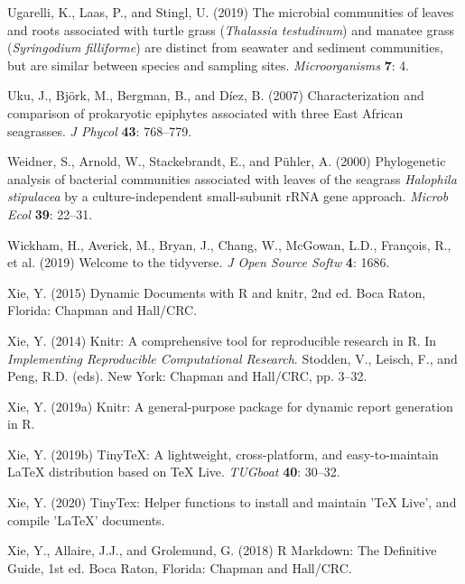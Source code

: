 \documentclass[12pt,]{article}
\begin{document}
\leavevmode\hypertarget{ref-Ugarelli2019}{}%
Ugarelli, K., Laas, P., and Stingl, U. (2019) The microbial communities
of leaves and roots associated with turtle grass (\emph{Thalassia
testudinum}) and manatee grass (\emph{Syringodium filliforme}) are
distinct from seawater and sediment communities, but are similar between
species and sampling sites. \emph{Microorganisms} \textbf{7}: 4.

\leavevmode\hypertarget{ref-Uku2007}{}%
Uku, J., Björk, M., Bergman, B., and Díez, B. (2007) Characterization
and comparison of prokaryotic epiphytes associated with three East
African seagrasses. \emph{J Phycol} \textbf{43}: 768--779.

\leavevmode\hypertarget{ref-Weidner2000}{}%
Weidner, S., Arnold, W., Stackebrandt, E., and Pühler, A. (2000)
Phylogenetic analysis of bacterial communities associated with leaves of
the seagrass \emph{Halophila stipulacea} by a culture-independent
small-subunit rRNA gene approach. \emph{Microb Ecol} \textbf{39}:
22--31.

\leavevmode\hypertarget{ref-Wickham2019}{}%
Wickham, H., Averick, M., Bryan, J., Chang, W., McGowan, L.D., François,
R., et al. (2019) Welcome to the tidyverse. \emph{J Open Source Softw}
\textbf{4}: 1686.

\leavevmode\hypertarget{ref-Xie2015}{}%
Xie, Y. (2015) Dynamic Documents with R and knitr, 2nd ed. Boca Raton,
Florida: Chapman and Hall/CRC.

\leavevmode\hypertarget{ref-Xie2014}{}%
Xie, Y. (2014) Knitr: A comprehensive tool for reproducible research in
R. In \emph{Implementing Reproducible Computational Research}. Stodden,
V., Leisch, F., and Peng, R.D. (eds). New York: Chapman and Hall/CRC,
pp. 3--32.

\leavevmode\hypertarget{ref-Xie2019}{}%
Xie, Y. (2019a) Knitr: A general-purpose package for dynamic report
generation in R.

\leavevmode\hypertarget{ref-Xie2019a}{}%
Xie, Y. (2019b) TinyTeX: A lightweight, cross-platform, and
easy-to-maintain LaTeX distribution based on TeX Live. \emph{TUGboat}
\textbf{40}: 30--32.

\leavevmode\hypertarget{ref-Xie2020}{}%
Xie, Y. (2020) TinyTex: Helper functions to install and maintain 'TeX
Live', and compile 'LaTeX' documents.

\leavevmode\hypertarget{ref-Xie2018}{}%
Xie, Y., Allaire, J.J., and Grolemund, G. (2018) R Markdown: The
Definitive Guide, 1st ed. Boca Raton, Florida: Chapman and Hall/CRC.
\end{document}
